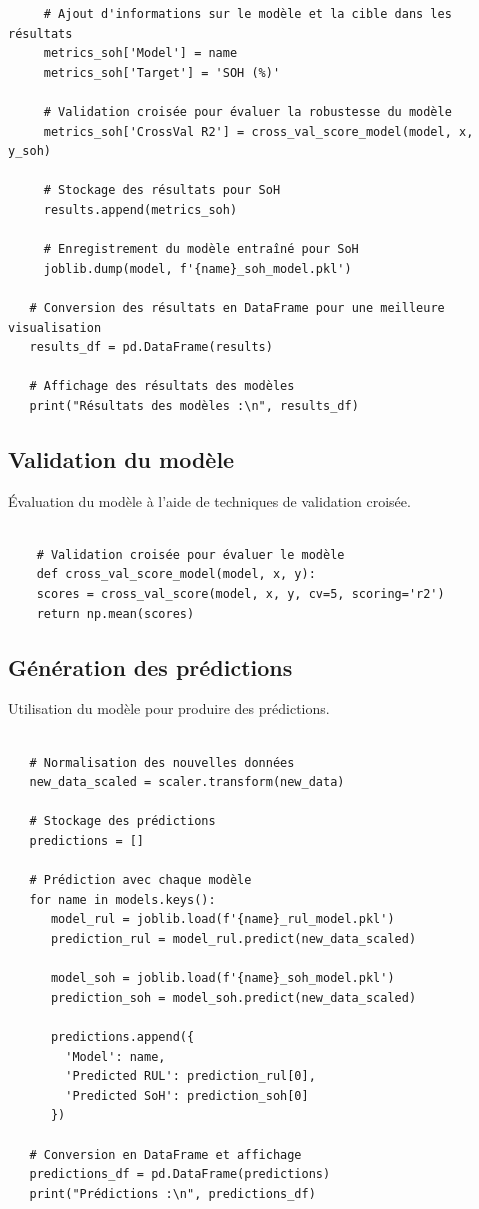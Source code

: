 \begin{verbatim}
     # Ajout d'informations sur le modèle et la cible dans les résultats
     metrics_soh['Model'] = name
     metrics_soh['Target'] = 'SOH (%)'
     
     # Validation croisée pour évaluer la robustesse du modèle
     metrics_soh['CrossVal R2'] = cross_val_score_model(model, x, y_soh)
     
     # Stockage des résultats pour SoH
     results.append(metrics_soh)
     
     # Enregistrement du modèle entraîné pour SoH
     joblib.dump(model, f'{name}_soh_model.pkl')
   
   # Conversion des résultats en DataFrame pour une meilleure visualisation
   results_df = pd.DataFrame(results)
	
   # Affichage des résultats des modèles
   print("Résultats des modèles :\n", results_df)
\end{verbatim}


\subsection{Validation du modèle}
Évaluation du modèle à l'aide de techniques de validation croisée.
\begin{verbatim}

	# Validation croisée pour évaluer le modèle
	def cross_val_score_model(model, x, y):
	scores = cross_val_score(model, x, y, cv=5, scoring='r2')
	return np.mean(scores)
\end{verbatim}

\subsection{Génération des prédictions}
Utilisation du modèle pour produire des prédictions.
\begin{verbatim}

   # Normalisation des nouvelles données
   new_data_scaled = scaler.transform(new_data)
   
   # Stockage des prédictions
   predictions = []
   
   # Prédiction avec chaque modèle
   for name in models.keys():
      model_rul = joblib.load(f'{name}_rul_model.pkl')
      prediction_rul = model_rul.predict(new_data_scaled)
      
      model_soh = joblib.load(f'{name}_soh_model.pkl')
      prediction_soh = model_soh.predict(new_data_scaled)
      
      predictions.append({
      	'Model': name,
      	'Predicted RUL': prediction_rul[0],
      	'Predicted SoH': prediction_soh[0]
      })
   
   # Conversion en DataFrame et affichage
   predictions_df = pd.DataFrame(predictions)
   print("Prédictions :\n", predictions_df)
\end{verbatim}


